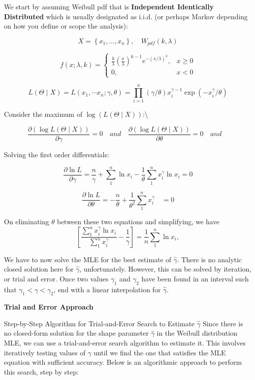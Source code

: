 \documentclass[
  12 pt,
  a4paper,
]{book}
\numberwithin{equation}{section}
\theoremstyle{plain}      %
\theoremstyle{definition} %
\theoremstyle{remark}     %
\theoremstyle{note}         %
\begin{document}
We start by assuming Weibull pdf that is \textbf{Independent Identically
Distributed} which is usually designated as i.i.d. (or perhaps Markov
depending on how you define or scope the analysis):

\[
X = \left\{x_{1}, \ldots, x_{n}\right\}, \quad W{_{pdf}}(k, \lambda)
\]

\[
f(x ; \lambda, k)= \begin{cases}\frac{k}{\lambda}\left(\frac{x}{\lambda}\right)^{k-1} e^{-(x / \lambda)^{k}}, & x \geq 0 \\ 0, & x<0\end{cases}
\]

\[
L\left(\Theta \mid X \right)= L\left(x_{1}, \cdots x_{n} ; \gamma, \theta\right)=\prod_{i=1}^{n}(\gamma / \theta) x_{i}^{\gamma-1} \exp \left(-x_{i}^{\gamma} / \theta\right)
\]

Consider the maximum of
\(\log \left(L\left(\Theta \mid X \right)\right)\):\textbackslash{}

\[
\frac{\partial (\log L\left(\Theta \mid X \right))}{\partial \gamma}=0 
\quad and \quad
\frac{\partial (\log L\left(\Theta \mid X \right))}{\partial \theta}=0 
\quad and \quad 
\]

Solving the first order differentials:

\[
\frac{\partial \ln L}{\partial \gamma}=\frac{n}{\gamma}+\sum_{1}^{n} \ln x_{i}-\frac{1}{\theta} \sum_{1}^{n} x_{i}^{\gamma} \ln x_{i}=0
\]

\[
\frac{\partial \ln L}{\partial \theta}=-\frac{n}{\theta}+\frac{1}{\theta^{2}} \sum_{1}^{n} x_{i}^{\gamma} \quad=0
\]

On eliminating \(\theta\) between these two equations and simplifying,
we have \[
\left[\frac{\sum_{1}^{n} x_{i}^{\gamma} \ln x_{i}}{\sum_{1}^{n} x_{i}^{\gamma}}-\frac{1}{\gamma}\right]=\frac{1}{n} \sum_{1}^{n} \ln x_{i},
\]

\noindent We have to now solve the MLE for the best estimate of
\(\hat{\gamma}\). There is no analytic closed solution here for
\(\hat{\gamma}\), unfortunately. However, this can be solved by
iteration, or trial and error. Once two values \(\gamma_{1}\) and
\(\gamma_{2}\) have been found in an interval such that
\(\gamma_{1}<\gamma<\gamma_{2}\), end with a linear interpolation for
\(\hat{\gamma}\).

\textbf{Trial and Error Approach}

Step-by-Step Algorithm for Trial-and-Error Search to Estimate
\(\hat{\gamma}\) Since there is no closed-form solution for the shape
parameter \(\hat{\gamma}\) in the Weibull distribution MLE, we can use a
trial-and-error search algorithm to estimate it. This involves
iteratively testing values of \(\gamma\) until we find the one that
satisfies the MLE equation with sufficient accuracy. Below is an
algorithmic approach to perform this search, step by step:
\end{document}
